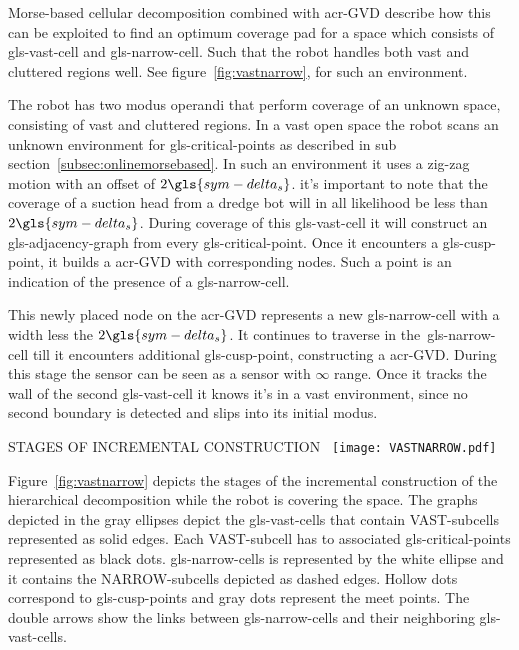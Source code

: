Morse-based cellular decomposition combined with \gls{acr-GVD} describe how this can be exploited to find an
optimum coverage pad for a space which consists of \gls{gls-vast-cell} and \gls{gls-narrow-cell}. Such
that the robot handles both vast and cluttered regions well. See figure~\ref{fig:vastnarrow}, for such an environment.

The robot has two modus operandi that perform coverage of an unknown space, consisting of vast and cluttered regions. In
a vast open space the robot scans an unknown environment for \gls{gls-critical-point}s as described in sub
section~\ref{subsec:onlinemorsebased}. In such an environment it uses a zig-zag motion with an offset of \( 2
\gls{sym-delta_s}  \). it's important to note that the coverage of a suction head from a dredge bot will in all
likelihood be less than \( 2 \gls{sym-delta_s} \). During coverage of this \gls{gls-vast-cell} it will construct an
\gls{gls-adjacency-graph} from every \gls{gls-critical-point}. Once it encounters a \gls{gls-cusp-point}, it
builds a \gls{acr-GVD} with corresponding nodes. Such a point is an indication of the presence of a
\gls{gls-narrow-cell}.

This newly placed node on the \gls{acr-GVD} represents a new \gls{gls-narrow-cell} with a width less the \( 2
\gls{sym-delta_s} \). It continues to traverse in the~\gls{gls-narrow-cell} till it encounters additional
\gls{gls-cusp-point}, constructing a \gls{acr-GVD}. During this stage the sensor can be seen as a sensor with \( \infty
\) range. Once it tracks the wall of the second \gls{gls-vast-cell} it knows it's in a vast environment, since no
second boundary is detected and slips into its initial modus.

\begin{RoyalFigure}[!htb, label=fig:vastnarrow]{STAGES OF INCREMENTAL CONSTRUCTION~\cite{acar_complete_2001}}
		\texttt{[image: VASTNARROW.pdf]}
\end{RoyalFigure}

Figure~\ref{fig:vastnarrow} depicts the stages of the incremental construction of the hierarchical decomposition while
the robot is covering the space. The graphs depicted in the gray ellipses depict the \gls{gls-vast-cell}s that contain
VAST-subcells represented as solid edges. Each VAST-subcell has to associated
\gls{gls-critical-point}s represented as black dots. \gls{gls-narrow-cell}s is represented by the white ellipse and it
contains the NARROW-subcells depicted as dashed edges. Hollow dots correspond to \gls{gls-cusp-point}s
and gray dots represent the meet points. The double arrows show the links between \gls{gls-narrow-cell}s and their
neighboring \gls{gls-vast-cell}s.

